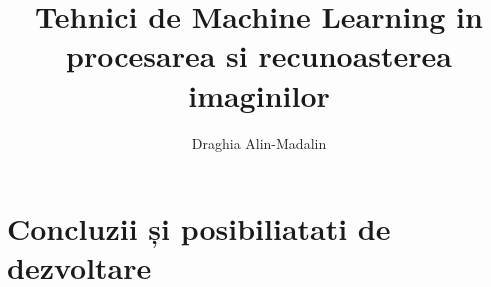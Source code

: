 \documentclass[a4paper,12pt,oneside]{book}%
\title{Tehnici de Machine Learning in procesarea si recunoasterea imaginilor}
\author{Draghia Alin-Madalin}
\begin{document}
\fancyfoot{}
\setcounter{page}{1}


\setcounter{page}{1}

\fancyfoot[C]{\thepage}
\setcounter{page}{1}








%

%

%

%

%
\chapter{Concluzii și posibiliatati de dezvoltare}



\end{document}
